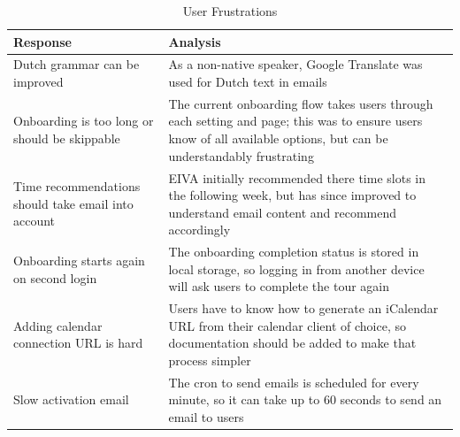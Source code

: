 \documentclass{article}
\begin{document}
\begin{table}[!htb]
	\caption{User Frustrations}
	\centering
	\begin{tabular}{p{4cm}p{7cm}}
		\hline
		\textbf{Response}                                   & \textbf{Analysis}                                                                                                                                                    \\
		\hline
		Dutch grammar can be improved                       & As a non-native speaker, Google Translate was used for Dutch text in emails                                                                                          \\
		\hline
		Onboarding is too long or should be skippable       & The current onboarding flow takes users through each setting and page; this was to ensure users know of all available options, but can be understandably frustrating \\
		\hline
		Time recommendations should take email into account & EIVA initially recommended there time slots in the following week, but has since improved to understand email content and recommend accordingly                      \\
		\hline
		Onboarding starts again on second login            & The onboarding completion status is stored in local storage, so logging in from another device will ask users to complete the tour again                             \\
		\hline
		Adding calendar connection URL is hard              & Users have to know how to generate an iCalendar URL from their calendar client of choice, so documentation should be added to make that process simpler              \\
		\hline
		Slow activation email                               & The cron to send emails is scheduled for every minute, so it can take up to 60 seconds to send an email to users                                                     \\
		\hline
	\end{tabular}
\end{table}
\end{document}
